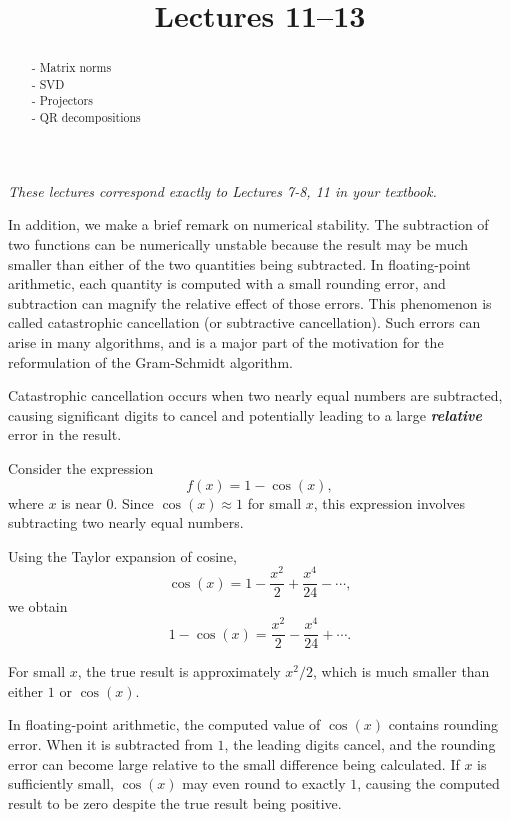 \documentclass{ximera}
\begin{document}
    \title{Lectures 11--13}
    
    \begin{abstract} 
        - Matrix norms \\
        - SVD \\
        - Projectors \\
        - QR decompositions
    \end{abstract}
    \maketitle

\textit{These lectures correspond exactly to Lectures 7-8, 11 in your textbook.}

In addition, we make a brief remark on numerical stability.  The subtraction of two functions can be numerically unstable because the result may be much smaller than either of the two quantities being subtracted. In floating-point arithmetic, each quantity is computed with a small rounding error, and subtraction can magnify the relative effect of those errors.  This phenomenon is called catastrophic cancellation (or subtractive cancellation). Such errors can arise in many algorithms, and is a major part of the motivation for the reformulation of the Gram-Schmidt algorithm.

Catastrophic cancellation occurs when two nearly equal numbers
are subtracted, causing significant digits to cancel and potentially
leading to a large \textbf{\textit{relative}} error in the result.

Consider the expression
\[
f(x) = 1 - \cos(x),
\]
where \(x\) is near \(0\). Since \(\cos(x) \approx 1\) for small
\(x\), this expression involves subtracting two nearly equal numbers.

Using the Taylor expansion of cosine,
\[
\cos(x)
= 1 - \frac{x^2}{2} + \frac{x^4}{24} - \cdots,
\]
we obtain
\[
1 - \cos(x)
= \frac{x^2}{2} - \frac{x^4}{24} + \cdots.
\]

For small \(x\), the true result is approximately \(x^2/2\),
which is much smaller than either \(1\) or \(\cos(x)\).

In floating-point arithmetic, the computed value of \(\cos(x)\)
contains rounding error. When it is subtracted from \(1\), the
leading digits cancel, and the rounding error can become large
relative to the small difference being calculated. If \(x\) is
sufficiently small, \(\cos(x)\) may even round to exactly \(1\),
causing the computed result to be zero despite the true result
being positive.
\end{document}
